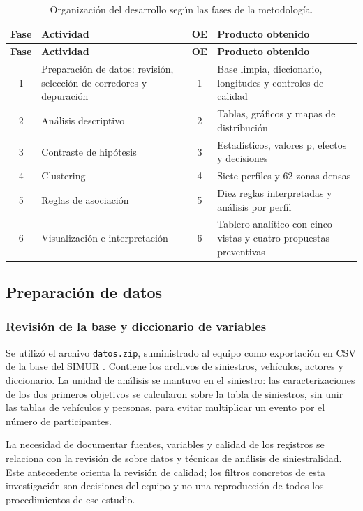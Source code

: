 \documentclass[12pt,letterpaper]{article}
\begin{document}
\begingroup
\begin{longtable}{@{}C{0.11}L{0.35}C{0.10}L{0.44}@{}}
\caption{Organización del desarrollo según las fases de la metodología.}\label{tab:avance-oe12}\\
\toprule
\textbf{Fase} & \textbf{Actividad} & \textbf{OE} & \textbf{Producto obtenido}\\
\midrule
\endfirsthead
\toprule
\textbf{Fase} & \textbf{Actividad} & \textbf{OE} & \textbf{Producto obtenido}\\
\midrule
{} & Preparación de datos: revisión, selección de corredores y depuración & 1 & Base limpia, diccionario, longitudes y controles de calidad\\
2 & Análisis descriptivo & 2 & Tablas, gráficos y mapas de distribución\\
3 & Contraste de hipótesis & 3 & Estadísticos, valores p, efectos y decisiones\\
4 & Clustering & 4 & Siete perfiles y 62 zonas densas\\
5 & Reglas de asociación & 5 & Diez reglas interpretadas y análisis por perfil\\
6 & Visualización e interpretación & 6 & Tablero analítico con cinco vistas y cuatro propuestas preventivas\\
\bottomrule
\end{longtable}
\endgroup

\hypertarget{etapa-1-adquisiciuxf3n-y-diccionario-de-variables}{%
\subsection{Preparación de datos}
\subsubsection{Revisión de la base y diccionario de variables}\label{etapa-1-adquisiciuxf3n-y-diccionario-de-variables}}

Se utilizó el archivo \texttt{datos.zip}, suministrado al equipo como
exportación en CSV de la base del SIMUR \citep{sdm2024}. Contiene los archivos de
siniestros, vehículos, actores y diccionario. La unidad de análisis se
mantuvo en el siniestro: las caracterizaciones de los dos primeros
objetivos se calcularon sobre la tabla de siniestros, sin unir las tablas
de vehículos y personas, para evitar multiplicar un evento por el número
de participantes.

La necesidad de documentar fuentes, variables y calidad de los registros
se relaciona con la revisión de \citet{chand2021} sobre datos y técnicas
de análisis de siniestralidad. Este antecedente orienta la revisión de
calidad; los filtros concretos de esta investigación son decisiones del
equipo y no una reproducción de todos los procedimientos de ese estudio.
\end{document}
